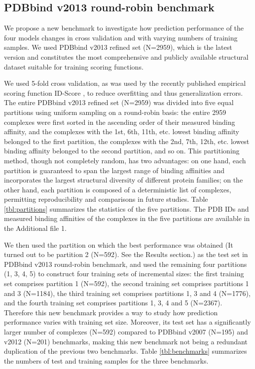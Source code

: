 \documentclass[linenumbers]{bmcart}
\begin{document}
\subsection*{PDBbind v2013 round-robin benchmark}

We propose a new benchmark to investigate how prediction performance of the four models changes in cross validation and with varying numbers of training samples. We used PDBbind v2013 refined set (N=2959), which is the latest version and constitutes the most comprehensive and publicly available structural dataset suitable for training scoring functions.

We used 5-fold cross validation, as was used by the recently published empirical scoring function ID-Score \cite{1305}, to reduce overfitting and thus generalization errors. The entire PDBbind v2013 refined set (N=2959) was divided into five equal partitions using uniform sampling on a round-robin basis: the entire 2959 complexes were first sorted in the ascending order of their measured binding affinity, and the complexes with the 1st, 6th, 11th, etc. lowest binding affinity belonged to the first partition, the complexes with the 2nd, 7th, 12th, etc. lowest binding affinity belonged to the second partition, and so on. This partitioning method, though not completely random, has two advantages: on one hand, each partition is guaranteed to span the largest range of binding affinities and incorporates the largest structural diversity of different protein families; on the other hand, each partition is composed of a deterministic list of complexes, permitting reproducibility and comparisons in future studies. Table \ref{tbl:partitions} summarizes the statistics of the five partitions. The PDB IDs and measured binding affinities of the complexes in the five partitions are available in the Additional file 1.

We then used the partition on which the best performance was obtained (It turned out to be partition 2 (N=592). See the Results section.) as the test set in PDBbind v2013 round-robin benchmark, and used the remaining four partitions (1, 3, 4, 5) to construct four training sets of incremental sizes: the first training set comprises partition 1 (N=592), the second training set comprises partitions 1 and 3 (N=1184), the third training set comprises partitions 1, 3 and 4 (N=1776), and the fourth training set comprises partitions 1, 3, 4 and 5 (N=2367). Therefore this new benchmark provides a way to study how prediction performance varies with training set size. Moreover, its test set has a significantly larger number of complexes (N=592) compared to PDBbind v2007 (N=195) and v2012 (N=201) benchmarks, making this new benchmark not being a redundant duplication of the previous two benchmarks. Table \ref{tbl:benchmarks} summarizes the numbers of test and training samples for the three benchmarks.
\end{document}
